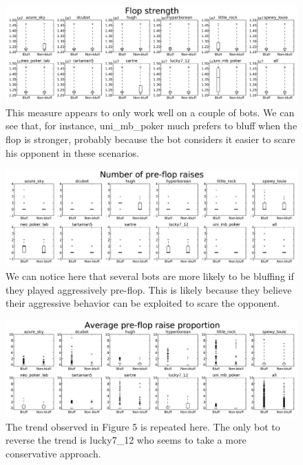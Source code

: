 \documentclass[letterpaper]{article}
\begin{document}
\clearpage
\begin{figure}[H]
    \centering
    \includegraphics[width=\textwidth,natwidth=610,natheight=642]{flopStrengthBW.jpg}
    \caption{This measure appears to only work well on a couple of bots. We can see that, for instance, uni\_mb\_poker much prefers to bluff when the flop is stronger, probably because the bot considers it easier to scare his opponent in these scenarios.}
\end{figure}

\begin{figure}[H]
    \centering
    \includegraphics[width=\textwidth,natwidth=610,natheight=642]{noRaisesBW.jpg}
    \caption{We can notice here that several bots are more likely to be bluffing if they played aggressively pre-flop. This is likely because they believe their aggressive behavior can be exploited to scare the opponent.}
\end{figure}

\begin{figure}[H]
    \centering
    \includegraphics[width=\textwidth,natwidth=610,natheight=642]{avgPreRaiseBW.jpg}
    \caption{The trend observed in Figure 5 is repeated here. The only bot to reverse the trend is lucky7\_12 who seems to take a more conservative approach.}
\end{figure}
\end{document}
